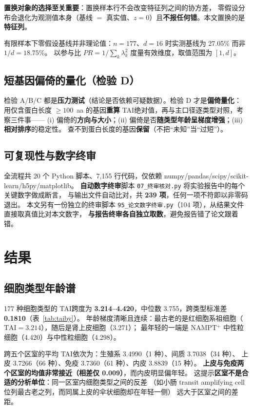 \documentclass[numsec,webpdf,modern,large]{oup-authoring-template}
\newcommand{\tai}{\textrm{TAI}}
\newcommand{\code}[1]{\texttt{\small #1}}
\begin{document}
\textbf{置换对象的选择至关重要}：置换样本行不会改变特征列之间的协方差，
零假设分布会退化为观测值本身（基线 $=$ 真实值、$z = 0$）且\textbf{不报任何错}。本文置换的是\textbf{特征列}。

有限样本下零假设基线并非理论值：$n = 177$、$d = 16$ 时实测基线为 27.05\% 而非 $1/d = 18.75\%$。
以参与比 $PR = 1/\sum_k \lambda_k^2$ 度量有效维度，取值范围为 $[1, d]$。

\subsection{短基因偏倚的量化（检验 D）}

检验 A/B/C 都是\textbf{压力测试}（结论是否依赖可疑数据）。检验 D 才是\textbf{偏倚量化}：
用仅含蛋白长度 $\ge 100$~aa 的基因\textbf{重算} \tai 绝对值，再与主口径逐类型对照，考察三件事——
(i) 偏倚的\textbf{方向与大小}；(ii) 偏倚是否\textbf{随类型年龄呈梯度增强}；(iii) \textbf{相对排序}的稳定性。
查不到蛋白长度的基因\textbf{保留}（不把“未知”当“过短”）。

\subsection{可复现性与数字终审}

全流程共 20 个 Python 脚本、7,155 行代码，仅依赖 numpy/pandas/scipy/scikit-learn/h5py/matplotlib。
\textbf{自动数字终审}脚本 \code{07\_终审核对.py} 将实验报告中的每个关键数字做成断言，
与输出文件自动比对，共 \textbf{239 项}，任何一项不符即以非零码退出。
本文另有一份独立的终审脚本 \code{95\_论文数字终审.py}（104 项），从结果文件直接取真值比对本文数字，
\textbf{与报告终审各自独立取数}，避免报告错了论文跟着错。

\section{结果}

\subsection{细胞类型年龄谱}

177 种细胞类型的 \tai 跨度为 \textbf{3.214--4.420}，中位数 3.755，跨类型标准差 \textbf{0.1810}（表~\ref{tab:taiby}）。
年龄梯度清晰且连续：最古老的是红细胞系祖细胞（$\tai = 3.214$），随后是肾上皮细胞（3.271）；
最年轻的一端是 NAMPT$^{+}$ 中性粒细胞（4.420）与中性粒细胞（4.298）。

跨五个区室的平均 \tai 依次为：生殖系 3.4990（1 种）、间质 3.7038（34 种）、
上皮 3.7266（66 种）、免疫 3.7360（61 种）、内皮 3.8839（15 种）。
\textbf{上皮与免疫两个区室的均值非常接近（相差仅 0.009）}，而内皮明显偏年轻。
这提示\textbf{区室不是合适的分析单位}：同一区室内细胞类型之间的反差
（如小肠 transit amplifying cell 位列最古老之列，而同属上皮的伞状细胞却在年轻一侧）
远大于区室之间的差距。
\end{document}
